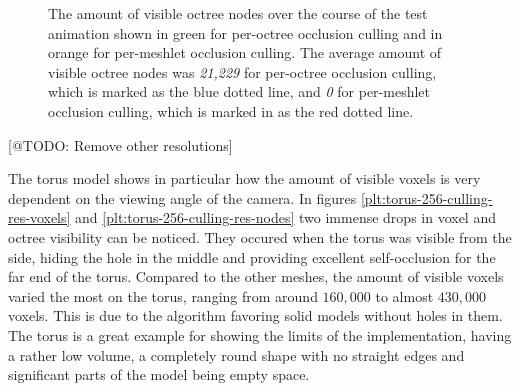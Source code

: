   \begin{figure}[h]            %
    \begin{center}
      \caption{The amount of visible octree nodes over the course of the test animation shown in green for 
      per-octree occlusion culling and in orange for per-meshlet occlusion culling. 
      The average amount of visible octree nodes was \emph{21,229} for per-octree occlusion culling, which is 
      marked as the blue dotted line, and \emph{0} for per-meshlet occlusion culling, which is marked in 
      as the red dotted line.}
      \label{plt:terrain-256-culling-res-nodes}
    \end{center}
  \end{figure}



[@TODO: Remove other resolutions]

\noindent
The torus model shows in particular how the amount of visible voxels is very dependent on the 
viewing angle of the camera. In figures \ref{plt:torus-256-culling-res-voxels} and 
\ref{plt:torus-256-culling-res-nodes} two immense drops in voxel and octree visibility can be noticed.
They occured when the torus was visible from the side, hiding the hole in the middle and providing excellent 
self-occlusion for the far end of the torus. Compared to the other meshes, the amount of visible voxels 
varied the most on the torus, ranging from around $160,000$ to almost $430,000$ voxels. This is due to the 
algorithm favoring solid models without holes in them. The torus is a great example for showing the limits of 
the implementation, having a rather low volume, a completely round shape with no straight edges and significant 
parts of the model being empty space. \\

